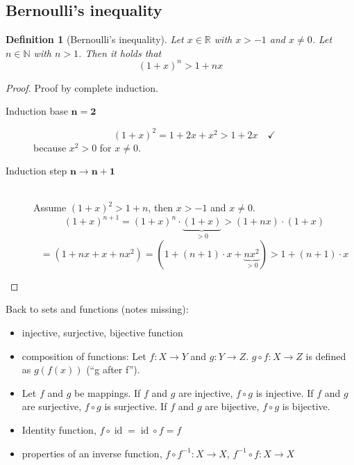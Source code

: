 \documentclass[a4paper,landscape,twocolumn]{article}
\newtheorem{defi}{Definition}
\begin{document}
\subsection{Bernoulli's inequality}
%
\begin{defi}[Bernoulli's inequality]
  Let $x \in \mathbb R$ with $x > -1$ and $x \neq 0$.
  Let $n \in \mathbb N$ with $n > 1$. Then it holds that
  \[ (1 + x)^n > 1 + nx \]
\end{defi}
\begin{proof}
  Proof by complete induction.
  \begin{description}
    \item[Induction base $\mathbf{n = 2}$]
      \[ (1 + x)^2 = 1 + 2x + x^2 > 1 + 2x \quad\checkmark \]
      because $x^2 > 0$ for $x \neq 0$.
    \item[Induction step $\mathbf{n \rightarrow n+1}$] \hfill{} \\
      Assume $(1+x)^2 > 1 + n$, then $x > -1$ and $x \neq 0$.
      \[ (1 + x)^{n+1} = (1 + x)^n \cdot \underbrace{(1 + x)}_{>0} > (1+nx) \cdot (1 + x) \]
      \[ = (1 + nx + x + nx^2) = (1 + (n+1)\cdot x + \underbrace{nx^2}_{>0}) > 1 + (n + 1) \cdot x \]
  \end{description}
\end{proof}

Back to sets and functions (notes missing):
\begin{itemize}
  \item injective, surjective, bijective function
  \item composition of functions: Let $f: X \rightarrow Y$ and $g: Y \rightarrow Z$. $g \circ f: X \rightarrow Z$ is defined as $g(f(x))$ (\enquote{g after f}).
  \item Let $f$ and $g$ be mappings. If $f$ and $g$ are injective, $f \circ g$ is injective. If $f$ and $g$ are surjective, $f \circ g$ is surjective. If $f$ and $g$ are bijective, $f \circ g$ is bijective.
  \item Identity function, $f \circ \operatorname{id} = \operatorname{id} \circ f = f$
  \item properties of an inverse function, $f \circ f^{-1}: X \rightarrow X$, $f^{-1} \circ f: X \rightarrow X$
\end{itemize}
\end{document}
